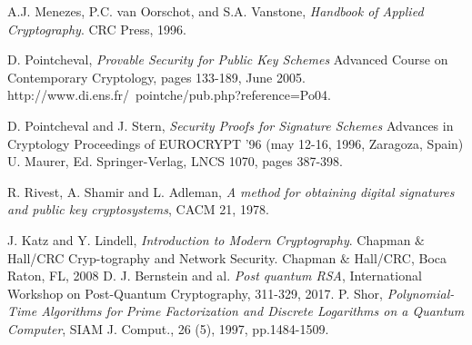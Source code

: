 \documentclass[a4paper,11pt]{article}
\begin{document}
\begin{thebibliography}{10}
 A.J. Menezes, P.C. van Oorschot, and S.A. Vanstone, \emph{Handbook of Applied Cryptography}. CRC Press, 1996.

 D. Pointcheval, \emph{Provable Security for Public Key Schemes} Advanced Course on Contemporary Cryptology, pages 133-189, June 2005. http://www.di.ens.fr/~pointche/pub.php?reference=Po04.


 D. Pointcheval and J. Stern, \emph{Security Proofs for Signature Schemes} Advances in Cryptology  Proceedings of EUROCRYPT '96 (may 12-16, 1996, Zaragoza, Spain) U. Maurer, Ed. Springer-Verlag, LNCS 1070, pages 387-398.

 R. Rivest, A. Shamir and L. Adleman, \emph{A method for obtaining digital signatures and public key cryptosystems}, CACM 21, 1978.

 J. Katz and Y. Lindell, \emph{Introduction to Modern Cryptography}. Chapman $\&$ Hall/CRC Cryp-tography and Network Security. Chapman $\&$ Hall/CRC, Boca Raton, FL, 2008
D. J. Bernstein and al.
\emph{Post quantum RSA},
International Workshop on Post-Quantum Cryptography, 311-329, 2017.
 P. Shor,
\emph{ Polynomial-Time Algorithms for Prime Factorization and Discrete Logarithms on a Quantum Computer},  SIAM J. Comput., 26 (5), 1997, pp.1484-1509.
\end{thebibliography}
\end{document}
